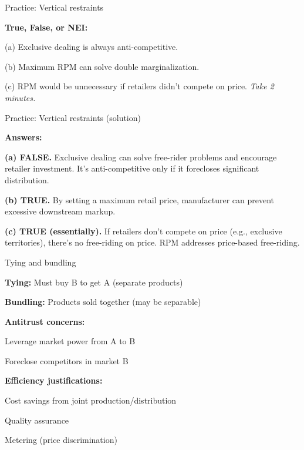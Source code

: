 \documentclass[notes,11pt, aspectratio=169]{beamer}
\newenvironment{wideitemize}{\itemize\addtolength{\itemsep}{10pt}}{\enditemize}
\begin{document}
\begin{frame}{Practice: Vertical restraints}
	\begin{wideitemize}
		\item \textbf{True, False, or NEI:}
		\item (a) Exclusive dealing is always anti-competitive.
		\item (b) Maximum RPM can solve double marginalization.
		\item (c) RPM would be unnecessary if retailers didn't compete on price.
	\end{wideitemize}
	\vspace{10pt}
	\centering
	\textit{Take 2 minutes.}
\end{frame}

\begin{frame}{Practice: Vertical restraints (solution)}
	\begin{wideitemize}
		\item \textbf{Answers:}
		\item \textbf{(a) FALSE.} Exclusive dealing can solve free-rider problems and encourage retailer investment. It's anti-competitive only if it forecloses significant distribution.
		\item \textbf{(b) TRUE.} By setting a maximum retail price, manufacturer can prevent excessive downstream markup.
		\item \textbf{(c) TRUE (essentially).} If retailers don't compete on price (e.g., exclusive territories), there's no free-riding on price. RPM addresses price-based free-riding.
	\end{wideitemize}
\end{frame}

\begin{frame}{Tying and bundling}
	\begin{wideitemize}
		\item \textbf{Tying:} Must buy B to get A (separate products)
		\item \textbf{Bundling:} Products sold together (may be separable)
		\item \textbf{Antitrust concerns:}
		\begin{wideitemize}
			\vspace{5pt}
			\item Leverage market power from A to B
			\item Foreclose competitors in market B
		\end{wideitemize}
		\item \textbf{Efficiency justifications:}
		\begin{wideitemize}
			\vspace{5pt}
			\item Cost savings from joint production/distribution
			\item Quality assurance
			\item Metering (price discrimination)
		\end{wideitemize}
	\end{wideitemize}
\end{frame}
\end{document}
